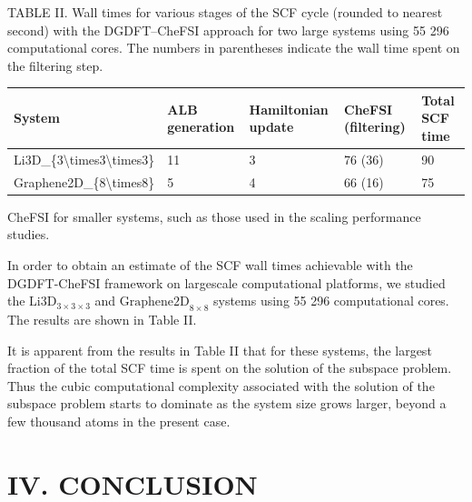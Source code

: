 \documentclass[
  10
]{article}
\newcounter{none} %
\begin{document}
TABLE II. Wall times for various stages of the SCF cycle (rounded to
nearest second) with the DGDFT--CheFSI approach for two large systems
using 55 296 computational cores. The numbers in parentheses indicate
the wall time spent on the filtering step.

{\def\LTcaptype{none} %
\begin{longtable}[]{@{}|l|l|l|l|l|@{}}
\toprule\noalign{}
\endhead
\bottomrule\noalign{}
\endlastfoot
\hline
System & ALB generation & Hamiltonian update & CheFSI (filtering) &
Total SCF time \\
\hline
Li3D\_\{3\textbackslash times3\textbackslash times3\} & 11 & 3 & 76 (36)
& 90 \\
\hline
Graphene2D\_\{8\textbackslash times8\} & 5 & 4 & 66 (16) & 75 \\
\hline
\end{longtable}
}

CheFSI for smaller systems, such as those used in the scaling
performance studies.

In order to obtain an estimate of the SCF wall times achievable with the
DGDFT-CheFSI framework on largescale computational platforms, we studied
the \(\mathrm { L i } 3 \mathrm { D } _ { 3 \times 3 \times 3 }\) and
\(\mathrm { G r a p h e n e 2 D } _ { 8 \times 8 }\) systems using 55
296 computational cores. The results are shown in Table II.

It is apparent from the results in Table II that for these systems, the
largest fraction of the total SCF time is spent on the solution of the
subspace problem. Thus the cubic computational complexity associated
with the solution of the subspace problem starts to dominate as the
system size grows larger, beyond a few thousand atoms in the present
case.

\section{IV. CONCLUSION}\label{iv.-conclusion}
\end{document}
